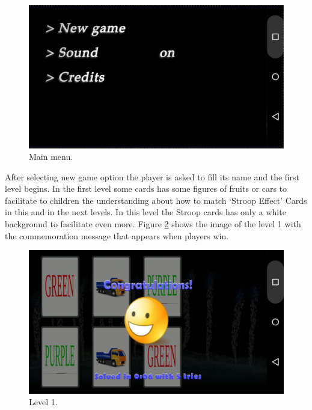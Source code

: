 						\begin{figure}[htp]
							\begin{center}
								\includegraphics[scale=0.35]{chapters/desenvolvimento/img/menu.png}
								\caption{Main menu.}
								\label{menu}
							\end{center}
						\end{figure}
		
After selecting new game option the player is asked to fill its name and the first level begins. In the first level some cards has some figures of fruits or cars to facilitate to children the understanding about how to match `Stroop Effect' Cards in this and in the next levels. In this level the Stroop cards has only a white background to facilitate even more. Figure \ref{lv1} shows the image of the level 1 with the commemoration message that appears when players win.

						\begin{figure}[htp]
							\begin{center}
								\includegraphics[scale=0.35]{chapters/desenvolvimento/img/memorystroop0.jpg}
								\caption{Level 1.}
								\label{lv1}
							\end{center}
						\end{figure}

